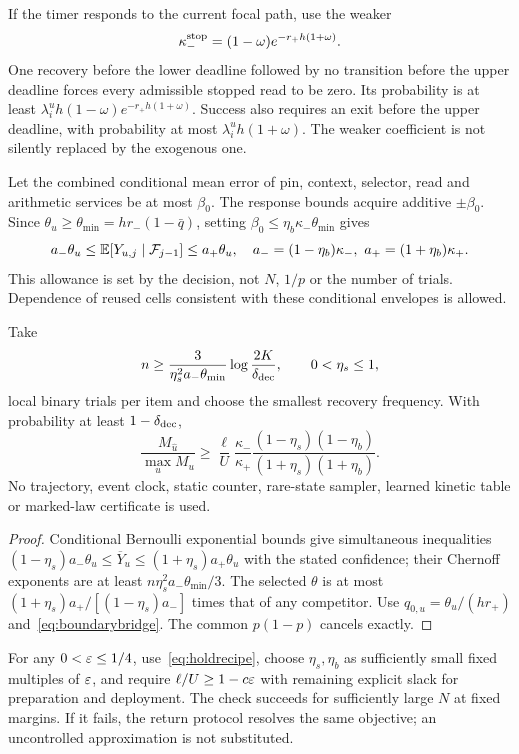 If the timer responds to the current focal path, use the weaker
\begin{equation}
 \kappa_-^{\rm stop}=(1-\omega)e^{-r_+h(1+\omega)}.
 \label{eq:stoppingtimer}
\end{equation}
One recovery before the lower deadline followed by no transition before the upper deadline forces every admissible stopped read to be zero. Its probability is at least $\lambda_i^u h(1-\omega)e^{-r_+h(1+\omega)}$. Success also requires an exit before the upper deadline, with probability at most $\lambda_i^u h(1+\omega)$. The weaker coefficient is not silently replaced by the exogenous one.

Let the combined conditional mean error of pin, context, selector, read and arithmetic services be at most $\beta_0$. The response bounds acquire additive $\pm\beta_0$. Since $\theta_u\ge\theta_{\min}=h r_-(1-\bar q)$, setting $\beta_0\le\eta_b\kappa_-\theta_{\min}$ gives
\[
 a_-\theta_u\le\mathbb E[Y_{u,j}\mid\mathcal F_{j-1}]\le a_+\theta_u,
 \quad a_-=(1-\eta_b)\kappa_-,\ a_+=(1+\eta_b)\kappa_+.
\]
This allowance is set by the decision, not $N$, $1/p$ or the number of trials. Dependence of reused cells consistent with these conditional envelopes is allowed.

\begin{theorem}\label{thm:decision}
Take
\begin{equation}
 n\ge\frac3{\eta_s^2a_-\theta_{\min}}\log\frac{2K}{\delta_{\rm dec}},
 \qquad0<\eta_s\le1,
 \label{eq:boundarysamples}
\end{equation}
local binary trials per item and choose the smallest recovery frequency. With probability at least $1-\delta_{\rm dec}$,
\begin{equation}
 \boxed{\frac{M_{\widehat u}}{\max_uM_u}
 \ge\frac\ell U\frac{\kappa_-}{\kappa_+}
 \frac{(1-\eta_s)(1-\eta_b)}{(1+\eta_s)(1+\eta_b)}.}
 \label{eq:boundarydecision}
\end{equation}
No trajectory, event clock, static counter, rare-state sampler, learned kinetic table or marked-law certificate is used.
\end{theorem}
\begin{proof}
Conditional Bernoulli exponential bounds give simultaneous inequalities
$(1-\eta_s)a_-\theta_u\le\overline Y_u\le(1+\eta_s)a_+\theta_u$ with the stated confidence; their Chernoff exponents are at least $n\eta_s^2a_-\theta_{\min}/3$. The selected $\theta$ is at most $(1+\eta_s)a_+/[(1-\eta_s)a_-]$ times that of any competitor. Use $q_{0,u}=\theta_u/(hr_+)$ and~\eqref{eq:boundarybridge}. The common $p(1-p)$ cancels exactly.
\end{proof}
For any $0<\varepsilon\le1/4$, use~\eqref{eq:holdrecipe}, choose $\eta_s,\eta_b$ as sufficiently small fixed multiples of $\varepsilon$, and require $\ell/U\ge1-c\varepsilon$ with remaining explicit slack for preparation and deployment. The check succeeds for sufficiently large $N$ at fixed margins. If it fails, the return protocol resolves the same objective; an uncontrolled approximation is not substituted.


